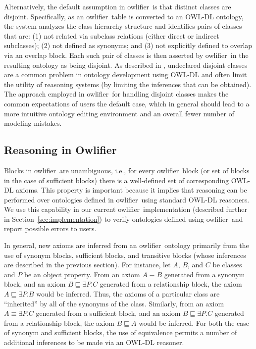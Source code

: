\documentclass[5p,authoryear]{elsarticle}
\newcommand{\Owlifier}{\textsf{Owlifier}}
\newcommand{\owlifier}{\textsf{owlifier}}
\newcommand{\secref}[1]{Section~\ref{#1}}
\begin{document}
Alternatively, the default assumption in \owlifier\ is that distinct
classes are disjoint. Specifically, as an \owlifier\ table is
converted to an OWL-DL ontology, the system analyzes the class
hierarchy structure and identifies pairs of classes that are: (1) not
related via subclass relations (either direct or indirect subclasses);
(2) not defined as synonyms; and (3) not explicitly defined to overlap
via an overlap block. Each such pair of classes is then asserted by
\owlifier\ in the resulting ontology as being disjoint. As described
in \citep{rector04:_owl_pizzas}, undeclared disjoint classes are a
common problem in ontology development using OWL-DL and often limit
the utility of reasoning systems (by limiting the inferences that can
be obtained). The approach employed in \owlifier\ for handling
disjoint classes makes the common expectations of users the default
case, which in general should lead to a more intuitive ontology
editing environment and an overall fewer number of modeling mistakes.


\subsection{Reasoning in \Owlifier}

Blocks in \owlifier\ are unambiguous, i.e., for every \owlifier\ block
(or set of blocks in the case of sufficient blocks) there is a
well-defined set of corresponding OWL-DL axioms. This property is
important because it implies that reasoning can be performed over
ontologies defined in \owlifier\ using standard OWL-DL reasoners.  We
use this capability in our current \owlifier\ implementation
(described further in \secref{sec:implementation}) to verify
ontologies defined using \owlifier\ and report possible errors to
users.

In general, new axioms are inferred from an \owlifier\ ontology
primarily from the use of synonym blocks, sufficient blocks, and
transitive blocks (whose inferences are described in the previous
section). For instance, let $A$, $B$, and $C$ be classes and $P$ be an
object property. From an axiom $A \equiv B$ generated from a synonym
block, and an axiom $B \sqsubseteq \exists P.C$ generated from a
relationship block, the axiom $A \sqsubseteq \exists P.B$ would be
inferred. Thus, the axioms of a particular class are ``inherited'' by
all of the synonyms of the class. Similarly, from an axiom $A \equiv
\exists P. C$ generated from a sufficient block, and an axiom $B
\sqsubseteq \exists P.C$ generated from a relationship block, the axiom
$B \sqsubseteq A$ would be inferred. For both the case of synonym and
sufficient blocks, the use of equivalence permits a number of
additional inferences to be made via an OWL-DL reasoner.
\end{document}
